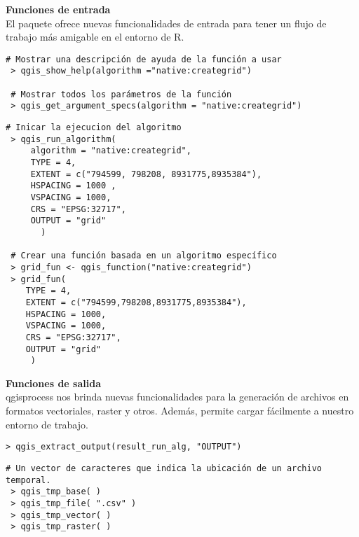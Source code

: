 \documentclass{article}
\begin{document}
\begin{multicols*}{3}
\begin{minipage}{\linewidth}
  \vspace{-5pt}
   \textbf{\fontsize{44}{44}\selectfont \textbf{Funciones de entrada}}\vspace{8pt}\\
   El paquete ofrece nuevas funcionalidades de entrada para tener un flujo de trabajo más amigable en el entorno de R.
\end{minipage}
\begin{lstlisting}[style=Rstyle]
 # Mostrar una descripción de ayuda de la función a usar
 > qgis_show_help(algorithm ="native:creategrid")

 # Mostrar todos los parámetros de la función
 > qgis_get_argument_specs(algorithm = "native:creategrid")
\end{lstlisting}
\begin{lstlisting}[style=Rstyle]
 # Inicar la ejecucion del algoritmo
 > qgis_run_algorithm(
     algorithm = "native:creategrid",
     TYPE = 4,
     EXTENT = c("794599, 798208, 8931775,8935384"),
     HSPACING = 1000 ,
     VSPACING = 1000,
     CRS = "EPSG:32717",
     OUTPUT = "grid"
       )

 # Crear una función basada en un algoritmo específico
 > grid_fun <- qgis_function("native:creategrid")
 > grid_fun(
    TYPE = 4,
    EXTENT = c("794599,798208,8931775,8935384"),
    HSPACING = 1000,
    VSPACING = 1000,
    CRS = "EPSG:32717",
    OUTPUT = "grid"
     )
\end{lstlisting}

\begin{minipage}{\linewidth}
  \vspace{12pt}
   \textbf{\fontsize{44}{44}\selectfont \textbf{Funciones de salida}}\vspace{8pt}\\
qgisprocess nos brinda nuevas funcionalidades para la generación de archivos en formatos vectoriales, raster y otros. Además, permite cargar fácilmente a nuestro entorno de trabajo.
\end{minipage}

\begin{lstlisting}[style=Rstyle]
 > qgis_extract_output(result_run_alg, "OUTPUT")
\end{lstlisting}
\begin{lstlisting}[style=Rstyle]
# Un vector de caracteres que indica la ubicación de un archivo temporal.
 > qgis_tmp_base( )
 > qgis_tmp_file( ".csv" )
 > qgis_tmp_vector( )
 > qgis_tmp_raster( )
\end{lstlisting}


\end{multicols*}
\end{document}

